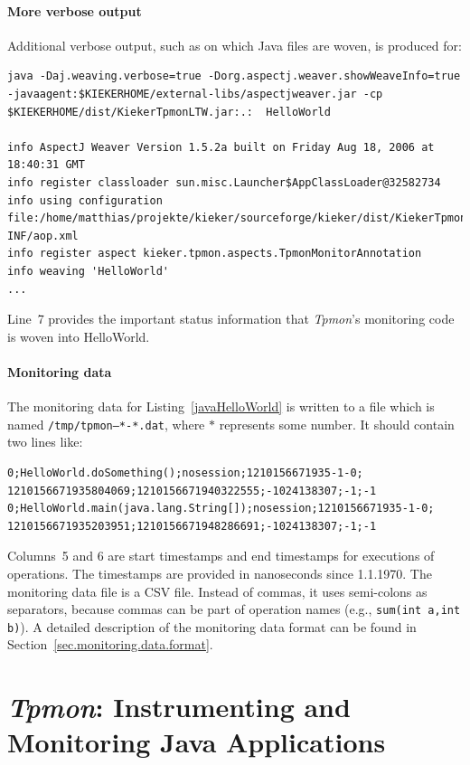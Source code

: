 \documentclass[a4paper,12pt]{scrartcl}
\newcommand{\tpmon}{\textit{Tpmon}}
\begin{document}
\paragraph{More verbose output}
Additional verbose output, such as on which Java files are woven, is produced for:
\begin{lstlisting}[caption={Verbose execution with AspectJ's Java agent.},label={lst2}]
java -Daj.weaving.verbose=true -Dorg.aspectj.weaver.showWeaveInfo=true -javaagent:$KIEKERHOME/external-libs/aspectjweaver.jar -cp $KIEKERHOME/dist/KiekerTpmonLTW.jar:.:  HelloWorld

info AspectJ Weaver Version 1.5.2a built on Friday Aug 18, 2006 at 18:40:31 GMT
info register classloader sun.misc.Launcher$AppClassLoader@32582734
info using configuration file:/home/matthias/projekte/kieker/sourceforge/kieker/dist/KiekerTpmonLTW.jar!/META-INF/aop.xml
info register aspect kieker.tpmon.aspects.TpmonMonitorAnnotation
info weaving 'HelloWorld'
...
\end{lstlisting}
Line~7 provides the important status information that \tpmon's monitoring code is woven into HelloWorld.



\paragraph{Monitoring data}
The monitoring data for Listing~\ref{javaHelloWorld} is written to a file which is named \texttt{/tmp/tpmon--*-*.dat}, where $*$ represents some number. It should contain two lines like:
\begin{lstlisting}[caption={Example monitoring data},label={OutputHelloWorld2}]
0;HelloWorld.doSomething();nosession;1210156671935-1-0; 1210156671935804069;1210156671940322555;-1024138307;-1;-1
0;HelloWorld.main(java.lang.String[]);nosession;1210156671935-1-0; 1210156671935203951;1210156671948286691;-1024138307;-1;-1
\end{lstlisting}

Columns~5 and 6 are start timestamps and end timestamps for executions of operations. The timestamps are provided in nanoseconds since 1.1.1970. The monitoring data file is a CSV file. Instead of commas, it uses semi-colons as separators, because commas can be part of operation names (e.g., \texttt{sum(int a,int b)}). A detailed description of the monitoring data format can be found in Section~\ref{sec.monitoring.data.format}.

\section{\textit{Tpmon}: Instrumenting and Monitoring Java Applications}\label{sec.tpmon}
\end{document}
